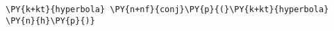 \begin{Verbatim}[commandchars=\\\{\}]
    \PY{k+kt}{hyperbola} \PY{n+nf}{conj}\PY{p}{(}\PY{k+kt}{hyperbola} \PY{n}{h}\PY{p}{)}
\end{Verbatim}
